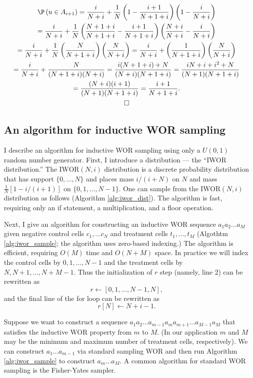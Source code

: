 \documentclass[12pt]{article}
\begin{document}
\begin{multline*}
\P \left( u \in A_{i+1} \right) = \frac{i}{N + i} + \frac{1}{N} \left(1 - \frac{i+1}{N+1+i}\right) \left( 1 - \frac{i}{N+i} \right) \\ = \frac{i}{N+i} + \frac{1}{N} \left( \frac{N+1+i}{N+1+i} - \frac{i+1}{N+1+i} \right)\left( \frac{N+i}{N+i} - \frac{i}{N+i} \right) \\ = \frac{i}{N+i} + \frac{1}{N} \left( \frac{N}{N+1+i} \right) \left( \frac{N}{N+i} \right) = \frac{i}{N+i} + \left( \frac{1}{N+1+i} \right)\left( \frac{N}{N+i} \right) \\ = \frac{i}{N+i} + \frac{N}{(N+1+i)(N+i)} = \frac{i(N+1+i) + N}{(N+i)(N+1+i)} = \frac{iN + i + i^2 + N}{(N+1)(N+1+i)} \\ = \frac{(N+i)(i+1)}{(N+1)(N+1+i)} = \frac{i+1}{N+1+i}. \\ \square
\end{multline*}


\subsection*{An algorithm for inductive WOR sampling}

I describe an algorithm for inductive WOR sampling using only a $U(0,1)$ random number generator. First, I introduce a distribution --- the ``IWOR distribution.'' The $\text{IWOR}(N, i)$ distribution is a discrete probability distribution that has support $\{ 0, \dots, N \}$ and places mass $i/(i + N)$ on $N$ and mass $\frac{1}{N}\left[1 - i/(i+1)\right]$ on $\{0, 1, \dots, N - 1\}.$ One can sample from the $\text{IWOR}(N,i)$ distribution as follows (Algorithm \ref{alg:iwor_dist}). The algorithm is fast, requiring only an if statement, a multiplication, and a floor operation.

Next, I give an algorithm for constructing an inductive WOR sequence $a_1 a_2 \dots a_M$ given negative control cells $c_1, \dots c_N$ and treatment cells $t_1, \dots, t_M$ (Algothtm \ref{alg:iwor_sample}; the algorithm uses zero-based indexing.) The algorithm is efficient, requiring $O(M)$ time and $O(N + M)$ space. In practice we will index the control cells by $0, 1, \dots, N-1$ and the treatment cells by $N, N+1, \dots, N + M - 1$. Thus the initialization of $r$ step (namely, line 2) can be rewritten as $$ r \leftarrow [0, 1, \dots, N - 1, N],$$ and the final line of the for loop can be rewritten as
$$ r[N] \leftarrow N + i - 1.$$

Suppose we want to construct a sequence $a_1 a_2 \dots a_{m-1} a_m a_{m+1} \dots a_{M-1}a_M$ that satisfies the inductive WOR property from $m$ to $M$. (In our application $m$ and $M$ may be the minimum and maximum number of treatment cells, respectively). We can construct $a_1\dots a_{m-1}$ via standard sampling WOR and then run Algorithm \ref{alg:iwor_sample} to construct $a_m\dots a_M$. A common algorithm for standard WOR sampling is the Fisher-Yates sampler. 
\end{document}
